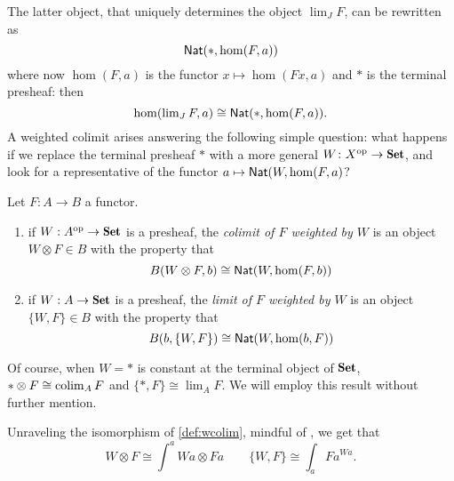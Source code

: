 The latter object, that uniquely determines the object $\lim_J F$, can be rewritten as
\[
\textsf{Nat}(*, \hom(F,a))
\]
where now $\hom(F,a)$ is the functor $x\mapsto \hom(Fx,a)$ and $*$ is the terminal presheaf: then
\[\textstyle
\hom(\lim_J F,a)\cong \textsf{Nat}(*, \hom(F,a)).
\]
A weighted colimit arises answering the following simple question: what happens if we replace the terminal presheaf $*$ with a more general $W\colon X^\opp\to \Sets$, and look for a representative of the functor $a\mapsto \textsf{Nat}(W, \hom(F,a)$? 
\begin{definition}\label{def:wcolim}
Let $F : A \to B$ a functor.
\begin{enumerate}
	\item if $W : A^\opp\to \Set$ is a presheaf, the \emph{colimit of $F$ weighted by $W$} is an object $W\otimes F\in B$ with the property that
	\[B(W\otimes F,b)\cong \textsf{Nat}(W, \hom(F,b))\]
	\item if $W : A \to \Set$ is a presheaf, the \emph{limit of $F$ weighted by $W$} is an object $\{W, F\}\in B$ with the property that
	\[B(b,\{W,F\})\cong \textsf{Nat}(W, \hom(b,F))\]
\end{enumerate}
\end{definition}
\begin{remark}
Of course, when $W=*$ is constant at the terminal object of $\Set$, $*\otimes F\cong \operatorname*{colim}_A F$ and $\{*,F\}\cong \lim_A F$. We will employ this result without further mention.
\end{remark}
\begin{remark}\label{wlim-are-coends}
Unraveling the isomorphism of \adef\ref{def:wcolim}, mindful of \cite[???]{McL}, we get that 
\[W\otimes F \cong \int^a Wa\otimes Fa\qquad \{W,F\}\cong \int_a Fa^{Wa}.\]
\end{remark}
\begin{remark}

\end{remark}
